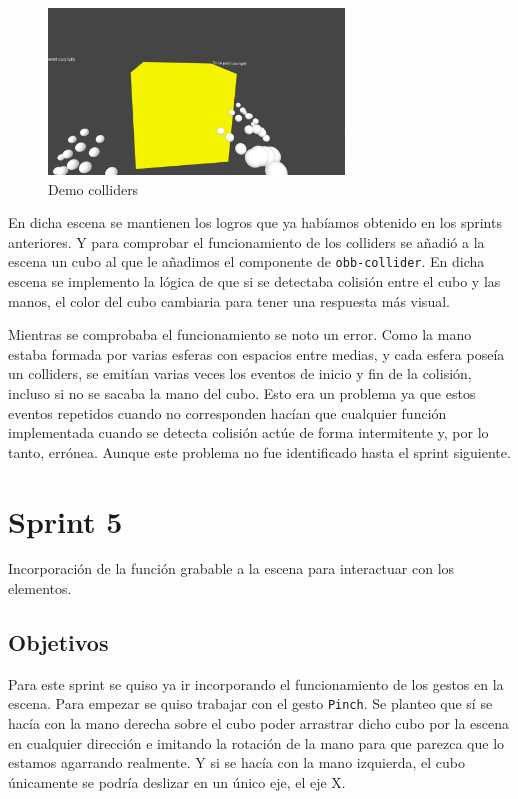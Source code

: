 \documentclass[a4paper, 12pt]{book}
\begin{document}
\begin{figure}[H] 
  \centering
  \includegraphics[width=0.7\textwidth]{img/collider.jpg} 
  \caption{Demo colliders}
  \label{fig:sprint4}
\end{figure}

En dicha escena se mantienen los logros que ya habíamos obtenido en los sprints anteriores. Y para comprobar el funcionamiento de los colliders se añadió a la escena un cubo
al que le añadimos el componente de \texttt{obb-collider}. En dicha escena se implemento la lógica de que si se detectaba colisión entre el cubo y las manos, el color del cubo cambiaria para tener una respuesta más visual. 

Mientras se comprobaba el funcionamiento se noto un error. Como la mano estaba formada por varias esferas con espacios entre medias, y cada esfera poseía un colliders, se emitían varias veces los eventos de inicio y fin de la colisión, incluso si no se sacaba la mano del cubo. 
Esto era un problema ya que estos eventos repetidos cuando no corresponden hacían que cualquier función implementada cuando se detecta colisión actúe de forma intermitente y, por lo tanto, errónea. Aunque este problema no fue identificado hasta el sprint siguiente. 

\section{Sprint 5}
\label{sec:sprint5}
Incorporación de la función grabable a la escena para interactuar con los elementos.

\subsection{Objetivos}
\label{subsec:objetivo-principal5}
Para este sprint se quiso ya ir incorporando el funcionamiento de los gestos en la escena. Para empezar se quiso trabajar con el gesto \texttt{Pinch}. Se planteo que sí se hacía con la mano derecha sobre el cubo poder 
arrastrar dicho cubo por la escena en cualquier dirección e imitando la rotación de la mano para que parezca que lo estamos agarrando realmente. Y si se hacía con la mano izquierda, el cubo únicamente se podría deslizar en un único eje, el eje X.
\end{document}
